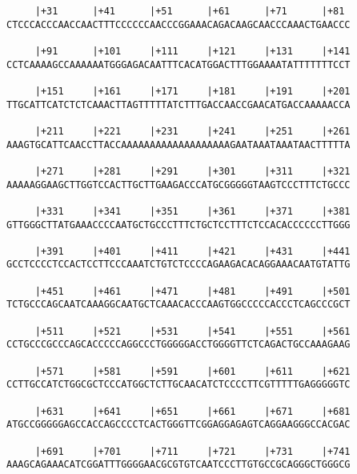 \documentclass{article}
\begin{document}
\begin{Verbatim}
     |+31      |+41      |+51      |+61      |+71      |+81 
CTCCCACCCAACCAACTTTCCCCCCAACCCGGAAACAGACAAGCAACCCAAACTGAACCC
                                                            
     |+91      |+101     |+111     |+121     |+131     |+141
CCTCAAAAGCCAAAAAATGGGAGACAATTTCACATGGACTTTGGAAAATATTTTTTTCCT
                                                            
     |+151     |+161     |+171     |+181     |+191     |+201
TTGCATTCATCTCTCAAACTTAGTTTTTATCTTTGACCAACCGAACATGACCAAAAACCA
                                                            
     |+211     |+221     |+231     |+241     |+251     |+261
AAAGTGCATTCAACCTTACCAAAAAAAAAAAAAAAAAAAGAATAAATAAATAACTTTTTA
                                                            
     |+271     |+281     |+291     |+301     |+311     |+321
AAAAAGGAAGCTTGGTCCACTTGCTTGAAGACCCATGCGGGGGTAAGTCCCTTTCTGCCC
                                                            
     |+331     |+341     |+351     |+361     |+371     |+381
GTTGGGCTTATGAAACCCCAATGCTGCCCTTTCTGCTCCTTTCTCCACACCCCCCTTGGG
                                                            
     |+391     |+401     |+411     |+421     |+431     |+441
GCCTCCCCTCCACTCCTTCCCAAATCTGTCTCCCCAGAAGACACAGGAAACAATGTATTG
                                                            
     |+451     |+461     |+471     |+481     |+491     |+501
TCTGCCCAGCAATCAAAGGCAATGCTCAAACACCCAAGTGGCCCCCACCCTCAGCCCGCT
                                                            
     |+511     |+521     |+531     |+541     |+551     |+561
CCTGCCCGCCCAGCACCCCCAGGCCCTGGGGGACCTGGGGTTCTCAGACTGCCAAAGAAG
                                                            
     |+571     |+581     |+591     |+601     |+611     |+621
CCTTGCCATCTGGCGCTCCCATGGCTCTTGCAACATCTCCCCTTCGTTTTTGAGGGGGTC
                                                            
     |+631     |+641     |+651     |+661     |+671     |+681
ATGCCGGGGGAGCCACCAGCCCCTCACTGGGTTCGGAGGAGAGTCAGGAAGGGCCACGAC
                                                            
     |+691     |+701     |+711     |+721     |+731     |+741
AAAGCAGAAACATCGGATTTGGGGAACGCGTGTCAATCCCTTGTGCCGCAGGGCTGGGCG
                                                            

\end{Verbatim}
\end{document}

